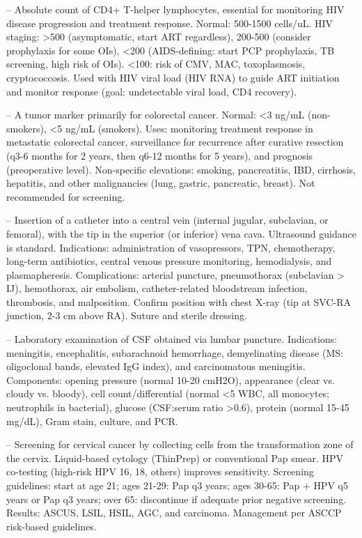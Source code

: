 -- Absolute count of CD4+ T-helper lymphocytes, essential for monitoring HIV disease progression and treatment response. Normal: 500-1500 cells/uL. HIV staging: >500 (asymptomatic, start ART regardless), 200-500 (consider prophylaxis for some OIs), <200 (AIDS-defining: start PCP prophylaxis, TB screening, high risk of OIs). <100: risk of CMV, MAC, toxoplasmosis, cryptococcosis. Used with HIV viral load (HIV RNA) to guide ART initiation and monitor response (goal: undetectable viral load, CD4 recovery).

-- A tumor marker primarily for colorectal cancer. Normal: <3 ng/mL (non-smokers), <5 ng/mL (smokers). Uses: monitoring treatment response in metastatic colorectal cancer, surveillance for recurrence after curative resection (q3-6 months for 2 years, then q6-12 months for 5 years), and prognosis (preoperative level). Non-specific elevations: smoking, pancreatitis, IBD, cirrhosis, hepatitis, and other malignancies (lung, gastric, pancreatic, breast). Not recommended for screening.

-- Insertion of a catheter into a central vein (internal jugular, subclavian, or femoral), with the tip in the superior (or inferior) vena cava. Ultrasound guidance is standard. Indications: administration of vasopressors, TPN, chemotherapy, long-term antibiotics, central venous pressure monitoring, hemodialysis, and plasmapheresis. Complications: arterial puncture, pneumothorax (subclavian > IJ), hemothorax, air embolism, catheter-related bloodstream infection, thrombosis, and malposition. Confirm position with chest X-ray (tip at SVC-RA junction, 2-3 cm above RA). Suture and sterile dressing.

-- Laboratory examination of CSF obtained via lumbar puncture. Indications: meningitis, encephalitis, subarachnoid hemorrhage, demyelinating disease (MS: oligoclonal bands, elevated IgG index), and carcinomatous meningitis. Components: opening pressure (normal 10-20 cmH2O), appearance (clear vs. cloudy vs. bloody), cell count/differential (normal <5 WBC, all monocytes; neutrophils in bacterial), glucose (CSF:serum ratio >0.6), protein (normal 15-45 mg/dL), Gram stain, culture, and PCR.

-- Screening for cervical cancer by collecting cells from the transformation zone of the cervix. Liquid-based cytology (ThinPrep) or conventional Pap smear. HPV co-testing (high-risk HPV 16, 18, others) improves sensitivity. Screening guidelines: start at age 21; ages 21-29: Pap q3 years; ages 30-65: Pap + HPV q5 years or Pap q3 years; over 65: discontinue if adequate prior negative screening. Results: ASCUS, LSIL, HSIL, AGC, and carcinoma. Management per ASCCP risk-based guidelines.

